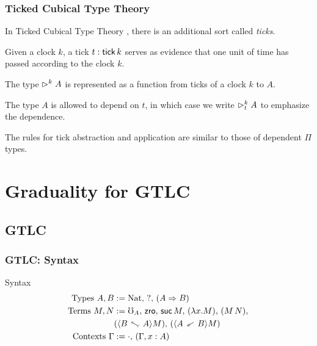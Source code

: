 \documentclass[
	11pt, %
]{beamer}
\begin{document}
\begin{frame}
	\frametitle{Ticked Cubical Type Theory}

	In Ticked Cubical Type Theory \cite{MV2019}, there is an additional sort
    called \emph{ticks}.

	\medskip

	Given a clock $k$, a tick $t : \mathsf{tick}\, k$ serves as evidence that one unit of time has passed according to the clock $k$.

  	\medskip

  	The type $\vartriangleright^k A$ is represented as a function from ticks of a clock $k$ to $A$.

	\medskip

  	The type $A$ is allowed to depend on $t$, in which case we write $\vartriangleright^k_t A$
  	to emphasize the dependence.

	\medskip

	The rules for tick abstraction and application are similar to those of dependent
  	$\Pi$ types. 

\end{frame}


\section{Graduality for GTLC}
\frame{\tableofcontents[currentsection]}


\subsection{GTLC}


\begin{frame}
	\frametitle{GTLC: Syntax}

	\begin{block}{Syntax}
	\begin{align*}
		\text{Types } A, B &:= \nat, \, \dyn, \, (A \To B) \\
		\text{Terms } M, N &:= \err_A, \, \zro, \,  \suc\, M, \, (\lda{x}{M}), \, (M\, N), \, \\
		& (\up{A}{B} M), \, (\dn{A}{B} M) \\
		\text{Contexts } \Gamma &:= \cdot, \, (\Gamma, x : A)
	\end{align*}
	\end{block}
	

\end{frame}
\end{document}
